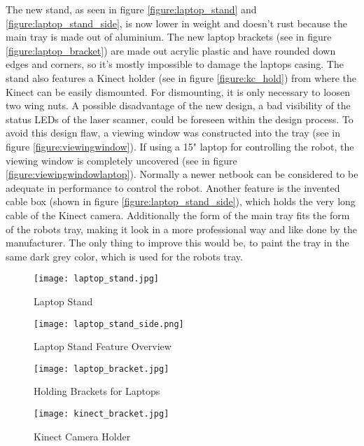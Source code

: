 The new stand, as seen in figure \vref{figure:laptop_stand} and \vref{figure:laptop_stand_side}, is now lower in
weight and doesn't rust because the main tray is made out of aluminium. The new laptop brackets 
(see in figure \vref{figure:laptop_bracket}) are made out acrylic plastic and have rounded down edges and corners, 
so it's mostly impossible to damage the laptops casing. The stand also features a Kinect holder 
(see in figure \vref{figure:kc_hold}) from where the Kinect can be easily dismounted. For dismounting, 
it is only necessary to loosen two wing nuts. A possible disadvantage of the new design, a bad visibility of
the status LEDs of the laser scanner, could be foreseen within the design process. 
To avoid this design flaw, a viewing window was constructed into the tray (see in figure \vref{figure:viewingwindow}). 
If using a 15" laptop for controlling the robot, the viewing window is completely uncovered 
(see in figure \vref{figure:viewingwindowlaptop}). Normally a newer netbook can be considered to be 
adequate in performance to control the robot. Another feature is the invented cable box 
(shown in figure \vref{figure:laptop_stand_side}), which holds the very long cable of the Kinect camera. 
Additionally the form of the main tray fits the form of the robots tray, making it look in a more professional 
way and like done by the manufacturer. The only thing to improve this would be, to paint the tray in the 
same dark grey color, which is used for the robots tray.

\begin{figure}[htp]
\begin{center}
  \texttt{[image: laptop\_stand.jpg]}
  \caption{Laptop Stand}
  \label{figure:laptop_stand}
\end{center}
\end{figure}
\begin{figure}[htp]
\begin{center}
  \texttt{[image: laptop\_stand\_side.png]}
  \caption{Laptop Stand Feature Overview}
  \label{figure:laptop_stand_side}
\end{center}
\end{figure}


\begin{figure}[htp]
\begin{center}
  \texttt{[image: laptop\_bracket.jpg]}
  \caption{Holding Brackets for Laptops}
  \label{figure:laptop_bracket}
\end{center}
\end{figure}
\begin{figure}[htp]
\begin{center}
  \texttt{[image: kinect\_bracket.jpg]}
  \caption{Kinect Camera Holder}
  \label{figure:kc_hold}
\end{center}
\end{figure}


